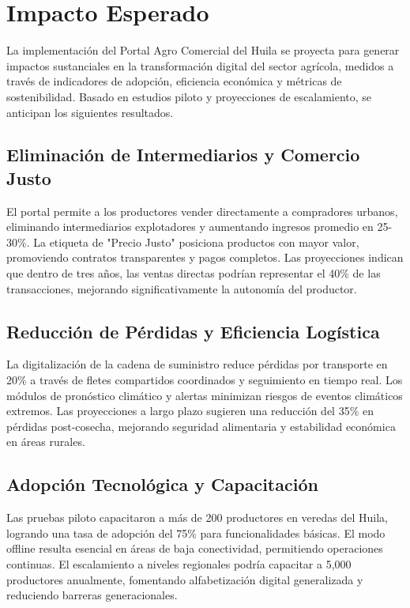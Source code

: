 \section{Impacto Esperado}

La implementación del Portal Agro Comercial del Huila se proyecta para generar impactos sustanciales en la transformación digital del sector agrícola, medidos a través de indicadores de adopción, eficiencia económica y métricas de sostenibilidad. Basado en estudios piloto y proyecciones de escalamiento, se anticipan los siguientes resultados.

\subsection{Eliminación de Intermediarios y Comercio Justo}

El portal permite a los productores vender directamente a compradores urbanos, eliminando intermediarios explotadores y aumentando ingresos promedio en 25-30\%. La etiqueta de "Precio Justo" posiciona productos con mayor valor, promoviendo contratos transparentes y pagos completos. Las proyecciones indican que dentro de tres años, las ventas directas podrían representar el 40\% de las transacciones, mejorando significativamente la autonomía del productor.
\subsection{Reducción de Pérdidas y Eficiencia Logística}

La digitalización de la cadena de suministro reduce pérdidas por transporte en 20\% a través de fletes compartidos coordinados y seguimiento en tiempo real. Los módulos de pronóstico climático y alertas minimizan riesgos de eventos climáticos extremos. Las proyecciones a largo plazo sugieren una reducción del 35\% en pérdidas post-cosecha, mejorando seguridad alimentaria y estabilidad económica en áreas rurales.
\subsection{Adopción Tecnológica y Capacitación}

Las pruebas piloto capacitaron a más de 200 productores en veredas del Huila, logrando una tasa de adopción del 75\% para funcionalidades básicas. El modo offline resulta esencial en áreas de baja conectividad, permitiendo operaciones continuas. El escalamiento a niveles regionales podría capacitar a 5,000 productores anualmente, fomentando alfabetización digital generalizada y reduciendo barreras generacionales.
